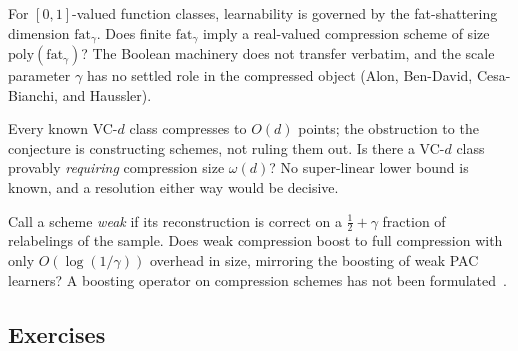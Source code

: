 \begin{openprob}
\label{op:fat-compression}
For $[0,1]$-valued function classes, learnability is governed by the
fat-shattering dimension $\mathrm{fat}_\gamma$.  Does finite $\mathrm{fat}_\gamma$
imply a real-valued compression scheme of size $\mathrm{poly}(\mathrm{fat}_\gamma)$?
The Boolean machinery does not transfer verbatim, and the scale parameter
$\gamma$ has no settled role in the compressed object (Alon, Ben-David,
Cesa-Bianchi, and Haussler).
\end{openprob}

\begin{openprob}
\label{op:compression-lower}
Every known VC-$d$ class compresses to $O(d)$ points; the obstruction to the
conjecture is constructing schemes, not ruling them out.  Is there a VC-$d$
class provably \emph{requiring} compression size $\omega(d)$?  No super-linear
lower bound is known, and a resolution either way would be decisive.
\end{openprob}

\begin{openprob}
\label{op:weak-compression}
Call a scheme \emph{weak} if its reconstruction is correct on a
$\tfrac{1}{2}+\gamma$ fraction of relabelings of the sample.  Does weak
compression boost to full compression with only $O(\log(1/\gamma))$ overhead in
size, mirroring the boosting of weak PAC learners?  A boosting operator on
compression schemes has not been formulated~\cite{MoranYehudayoff2016}.
\end{openprob}



\subsection*{Exercises}

